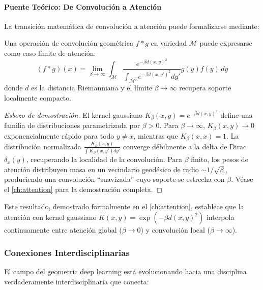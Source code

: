 \paragraph{Puente Teórico: De Convolución a Atención}

La transición matemática de convolución a atención puede formalizarse mediante:

\begin{theorem}
Una operación de convolución geométrica $f * g$ en variedad $\mathcal{M}$ puede expresarse como caso límite de atención:
\begin{equation}
(f * g)(x) = \lim_{\beta \to \infty} \int_{\mathcal{M}} \frac{e^{-\beta d(x,y)^2}}{\int_{\mathcal{M}'} e^{-\beta d(x,y')^2} dy'} g(y) f(y) \, dy
\end{equation}
donde $d$ es la distancia Riemanniana y el límite $\beta \to \infty$ recupera soporte localmente compacto.
\end{theorem}

\begin{proof}[Esbozo de demostración]
El kernel gaussiano $K_\beta(x,y) = e^{-\beta d(x,y)^2}$ define una familia de distribuciones parametrizada por $\beta > 0$. Para $\beta \to \infty$, $K_\beta(x,y) \to 0$ exponencialmente rápido para todo $y \neq x$, mientras que $K_\beta(x,x) = 1$. La distribución normalizada $\frac{K_\beta(x,y)}{\int K_\beta(x,y') dy'}$ converge débilmente a la delta de Dirac $\delta_x(y)$, recuperando la localidad de la convolución. Para $\beta$ finito, los pesos de atención distribuyen masa en un vecindario geodésico de radio $\sim 1/\sqrt{\beta}$, produciendo una convolución ``suavizada'' cuyo soporte se estrecha con $\beta$. Véase el \autoref{ch:attention} para la demostración completa.
\end{proof}

Este resultado, demostrado formalmente en el \autoref{ch:attention}, establece que la atención con kernel gaussiano $K(x,y) = \exp(-\beta d(x,y)^2)$ interpola continuamente entre atención global ($\beta \to 0$) y convolución local ($\beta \to \infty$).

\subsubsection{Conexiones Interdisciplinarias}

El campo del geometric deep learning está evolucionando hacia una disciplina verdaderamente interdisciplinaria que conecta:

